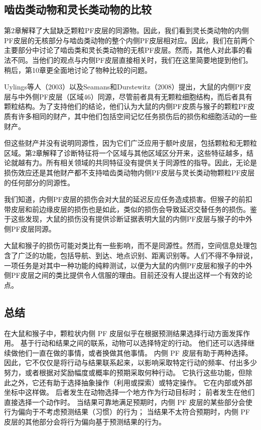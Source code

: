 \subsection{啮齿类动物和灵长类动物的比较}
第2章解释了大鼠缺乏颗粒PF皮层的同源物。因此，我们看到灵长类动物的内侧PF皮层的无核部分与啮齿类动物的整个内侧PF皮层相对应。因此，我们在前两个主要部分中讨论了啮齿类和灵长类动物的无核PF皮层。然而，其他人对此事的看法不同。当他们的观点与内侧PF皮层直接相关时，我们在这里简要地提到他们。稍后，第10章更全面地讨论了物种比较的问题。\par
Uylings等人（2003）以及Seamans和Durstewitz（2008）提出，大鼠的内侧PF皮层与中外侧PF皮层（区域46）同源，尽管前者具有无颗粒细胞结构，而后者具有颗粒结构。为了支持他们的结论，他们认为大鼠的内侧PF皮质与猴子的颗粒PF皮质有许多相同的财产，其中他们包括空间记忆任务损伤后的损伤和细胞活动的一些财产。\par
但这些财产并没有说明同源性，因为它们广泛应用于额叶皮层，包括颗粒和无颗粒区域。第2章解释了诊断特征将一个区域与其他区域区分开来，这些特征越多，结论就越有力。所有相关领域的共同特征没有提供关于同源性的指导。因此，无论是损伤效应还是其他财产都不支持啮齿类动物内侧PF皮层与灵长类动物颗粒PF皮层的任何部分的同源性。\par
我们知道，内侧PF皮层的损伤会对大鼠的延迟反应任务造成损害\cite{Kolb et al,1974}。但猴子的前扣带皮层和前边缘皮层的损伤也是如此\cite{Meunier et al,1997}，类似的损伤会导致延迟交替任务的损伤\cite{Rushworth et al,2003}。鉴于这些发现，大鼠的损伤没有提供诊断证据表明大鼠的内侧PF皮层与猴子的中外侧PF皮层同源。\par
大鼠和猴子的损伤可能对类比有一些影响，而不是同源性\cite{Brown&Bowman,2002}。然而，空间信息处理包含了广泛的功能，包括导航、到达、地点识别、距离识别等。人们不得不争辩说，一项任务是对其中一种功能的纯粹测试，以便为大鼠的内侧PF皮层和猴子的中外侧PF皮层之间的类比提供令人信服的理由。目前还没有人提出这样一个有效的论点。\par
\subsection{总结}
在大鼠和猴子中，颗粒状内侧 PF 皮层似乎在根据预测结果选择行动方面发挥作用。 基于行动和结果之间的联系，动物可以选择特定的行动。 他们还可以选择继续做他们一直在做的事情，或者换做其他事情。 内侧 PF 皮层有助于两种选择。 因此，它不仅仅是将行动与结果联系起来，以影响采取特定行动的频率、付出多少努力，或者根据对奖励幅度或概率的预期采取何种行动。 它执行这些功能，但除此之外，它还有助于选择抽象操作（利用或探索）或特定操作。 它在内部或外部坐标中这样做。 后者发生在动物选择一个地方作为行动目标时； 前者发生在他们直接选择一个动作时。 当结果可靠地满足预期时，内侧 PF 皮层的某些部分会使行为偏向于不考虑预测结果（习惯）的行为； 当结果不太符合预期时，内侧 PF 皮层的其他部分会将行为偏向基于预测结果的行为。\par
